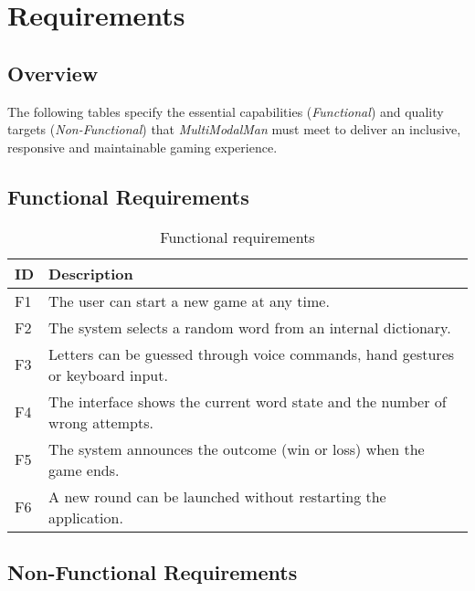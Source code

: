 \section{Requirements}

\subsection{Overview}
The following tables specify the essential capabilities (\textit{Functional}) and quality targets (\textit{Non-Functional}) that \textit{MultiModalMan} must meet to deliver an inclusive, responsive and maintainable gaming experience.

\subsection{Functional Requirements}

\begin{table}[h]
\centering
\caption{Functional requirements}
\begin{tabularx}{\linewidth}{@{}lX@{}}
\toprule
\textbf{ID} & \textbf{Description} \\ \midrule
F1 & The user can start a new game at any time. \\
F2 & The system selects a random word from an internal dictionary. \\
F3 & Letters can be guessed through voice commands, hand gestures or keyboard input. \\
F4 & The interface shows the current word state and the number of wrong attempts. \\
F5 & The system announces the outcome (win or loss) when the game ends. \\
F6 & A new round can be launched without restarting the application. \\ \bottomrule
\end{tabularx}
\end{table}

\subsection{Non-Functional Requirements}

